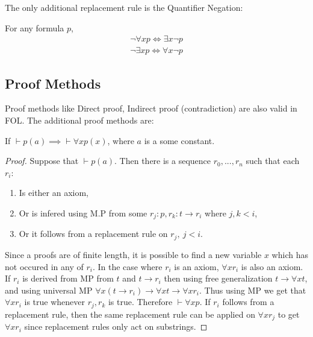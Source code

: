 The only additional replacement rule is the Quantifier Negation:
\begin{property}
  For any formula $p$,
  \begin{align*}
    \lnot \forall x p \iff \exists x \lnot p\\
    \lnot \exists x p \iff \forall x \lnot p
  \end{align*}
\end{property}
\subsection{Proof Methods}
Proof methods like Direct proof, Indirect proof (contradiction) are also valid in FOL. The additional proof methods are:
\begin{proposition}
  If $\vdash p(a) \implies \vdash \forall xp(x)$, where $a$ is a some constant.
\end{proposition}
\begin{proof}
  Suppose that $\vdash p(a)$. Then there is a sequence $r_0,...,r_n$ such that each $r_i$:
  \begin{enumerate}
    \item Is either an axiom,
    \item Or is infered using M.P from some $r_j:p, r_k:t\to r_i$ where $j,k<i$,
    \item Or it follows from a replacement rule on $r_j,\ j<i$.
  \end{enumerate}
  Since a proofs are of finite length, it is possible to find a new variable $x$ which has not occured in any of $r_i$. In the case where $r_i$ is an axiom, $\forall x r_i$ is also an axiom. If $r_i$ is derived from MP from $t$ and $t\to r_i$ then using free generalization $t\to \forall xt$, and using universal MP $\forall x (t\to r_i) \to \forall x t \to \forall x r_i$. Thus using MP we get that $\forall x r_i$ is true whenever $r_j, r_k$ is true. Therefore $\vdash \forall x p$. If $r_i$ follows from a replacement rule, then the same replacement rule can be applied on $\forall x r_j$ to get $\forall x r_i$ since replacement rules only act on substrings.
\end{proof}
